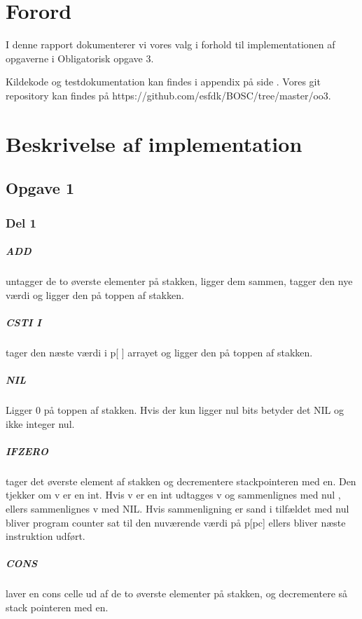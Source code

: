 \chapter{Forord}
I denne rapport dokumenterer vi vores valg i forhold til implementationen af opgaverne i Obligatorisk opgave 3.

Kildekode og testdokumentation kan findes i appendix på side \pageref{Appendix}. Vores git repository kan findes på https://github.com/esfdk/BOSC/tree/master/oo3.

\chapter{Beskrivelse af implementation}
\section{Opgave 1}
\label{O1}

\subsection{Del 1}
\label{O1_1}
	\paragraph{ADD} untagger de to øverste elementer på stakken, ligger dem sammen, tagger den nye værdi og ligger den på toppen af stakken.
	\paragraph{CSTI I} tager den næste værdi i p[ ] arrayet og ligger den på toppen af stakken.
	\paragraph{NIL} Ligger 0 på toppen af stakken. Hvis der kun ligger nul bits betyder det NIL og ikke integer nul.
	\paragraph{IFZERO} tager det øverste element af stakken og decrementere stackpointeren med en. Den tjekker om v er en int. Hvis v er en int udtagges v og sammenlignes med nul , ellers sammenlignes v med NIL. Hvis sammenligning er sand i tilfældet med nul bliver program counter sat til den nuværende værdi på p[pc] ellers bliver næste instruktion udført.
	\paragraph{CONS} laver en cons celle ud af de to øverste elementer på stakken, og decrementere så stack pointeren med en.
